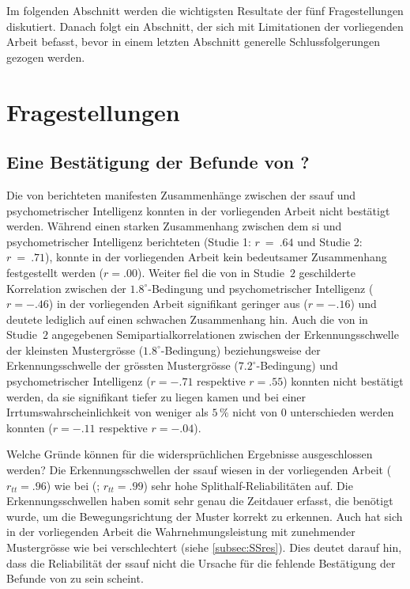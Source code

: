\documentclass[11pt, twoside, a4paper]{book}		%
\begin{document}
Im folgenden Abschnitt werden die wichtigsten Resultate der fünf Fragestellungen diskutiert. Danach folgt ein Abschnitt, der sich mit Limitationen der vorliegenden Arbeit befasst, bevor in einem letzten Abschnitt generelle Schlussfolgerungen gezogen werden.



\section{Fragestellungen}

\subsection{Eine Bestätigung der Befunde von \citet{Melnick2013}?}

Die von \citeauthor{Melnick2013} berichteten manifesten Zusammenhänge zwischen der \gls{ssauf} und psychometrischer Intelligenz konnten in der vorliegenden Arbeit nicht bestätigt werden.
Während \citeauthor{Melnick2013} einen starken Zusammenhang zwischen dem \gls{si} und psychometrischer Intelligenz berichteten (Studie 1: $r~=~.64$ und Studie 2: $r~=~.71$), konnte in der vorliegenden Arbeit kein bedeutsamer Zusammenhang festgestellt werden ($r=.00$). 
Weiter fiel die von \citeauthor{Melnick2013} in Studie~$2$ geschilderte Korrelation zwischen der $1.8^{\circ}$-Bedingung und psychometrischer Intelligenz ($r=-.46$) in der vorliegenden Arbeit signifikant geringer aus ($r=-.16$) und deutete lediglich auf einen schwachen Zusammenhang hin.
Auch die von \citeauthor{Melnick2013} in Studie~$2$ angegebenen Semipartialkorrelationen zwischen der Erkennungsschwelle der kleinsten Mustergrösse ($1.8^{\circ}$-Bedingung) beziehungsweise der Erkennungsschwelle der grössten Mustergrösse ($7.2^{\circ}$-Bedingung) und psychometrischer Intelligenz ($r=-.71$ respektive $r=.55$) konnten nicht bestätigt werden, da sie signifikant tiefer zu liegen kamen und bei einer Irrtumswahrscheinlichkeit von weniger als $5\,\%$ nicht von $0$ unterschieden werden konnten ($r=-.11$ respektive $r=-.04$).

Welche Gründe können für die widersprüchlichen Ergebnisse ausgeschlossen werden?
Die Erkennungsschwellen der \gls{ssauf} wiesen in der vorliegenden Arbeit ($r_{tt} = .96$) wie bei \citeauthor{Melnick2013} (\citeyear{Melnick2013}; $r_{tt} = .99$) sehr hohe Splithalf-Reliabilitäten auf. Die Erkennungsschwellen haben somit sehr genau die Zeitdauer erfasst, die benötigt wurde, um die Bewegungsrichtung der Muster korrekt zu erkennen. Auch hat sich in der vorliegenden Arbeit die Wahrnehmungsleistung mit zunehmender Mustergrösse wie bei \citeauthor{Melnick2013} verschlechtert (siehe \autoref{subsec:SSres}). Dies deutet darauf hin, dass die Reliabilität der \gls{ssauf} nicht die Ursache für die fehlende Bestätigung der Befunde von \citeauthor{Melnick2013} zu sein scheint.
\end{document}
